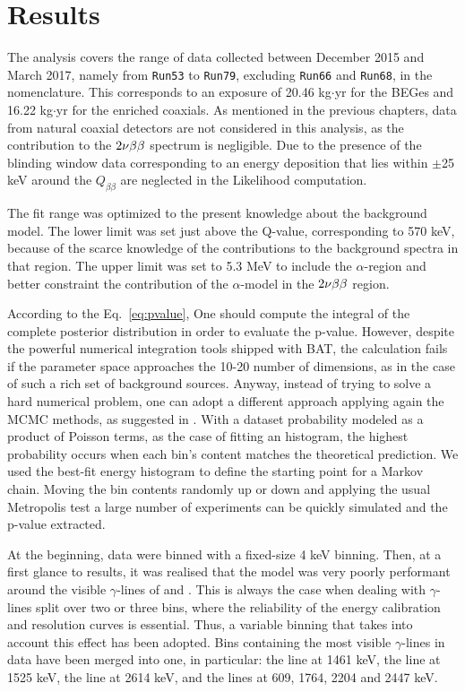 \section{Results}\label{sec:results}
The analysis covers the range of data collected between December 2015 and March 2017, namely from \texttt{Run53} to \texttt{Run79}, excluding \texttt{Run66} and \texttt{Run68}, in the {\gerda} nomenclature. This corresponds to an exposure of 20.46 kg$\cdot$yr for the BEGes and 16.22 kg$\cdot$yr for the enriched coaxials. As mentioned in the previous chapters, data from natural coaxial detectors are not considered in this analysis, as the contribution to the $2\nu\beta\beta$ spectrum is negligible. Due to the presence of the blinding window data corresponding to an energy deposition that lies within $\pm$25 keV around the $Q_{\beta\beta}$ are neglected in the Likelihood computation.

The fit range was optimized to the present knowledge about the background model. The lower limit was set just above the  Q-value, corresponding to 570 keV, because of the scarce knowledge of the contributions to the background spectra in that region. The upper limit was set to 5.3 MeV to include the $\alpha$-region and better constraint the contribution of the $\alpha$-model in the $2\nu\beta\beta$ region.

 According to the Eq.~\ref{eq:pvalue}, One should compute the integral of the complete posterior distribution in order to evaluate the p-value. However, despite the powerful numerical integration tools shipped with BAT, the calculation fails if the parameter space approaches the 10-20 number of dimensions, as in the case of such a rich set of background sources. Anyway, instead of trying to solve a hard numerical problem, one can adopt a different approach applying again the MCMC methods, as suggested in \cite{p-value}. With a dataset probability modeled as a product of Poisson terms, as the case of fitting an histogram, the highest probability occurs when each bin's content matches the theoretical prediction. We used the best-fit energy histogram to define the starting point for a Markov chain. Moving the bin contents randomly up or down and applying the usual Metropolis test a large number of experiments can be quickly simulated and the p-value extracted.

 At the beginning, data were binned with a fixed-size 4 keV binning. Then, at a first glance to results, it was realised that the model was very poorly performant around the visible $\gamma$-lines of  and . This is always the case when dealing with $\gamma$-lines split over two or three bins, where the reliability of the energy calibration and resolution curves is essential. Thus, a variable binning that takes into account this effect has been adopted. Bins containing the most visible $\gamma$-lines in data have been merged into one, in particular: the  line at 1461 keV, the  line at 1525 keV, the  line at 2614 keV, and the  lines at 609, 1764, 2204 and 2447 keV.

